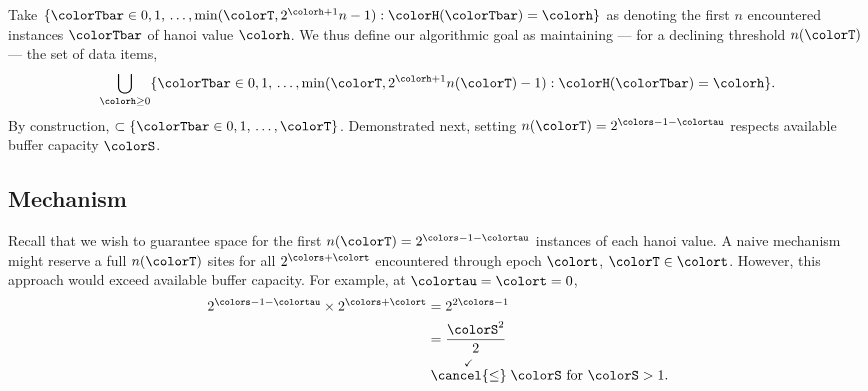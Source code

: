 Take $\{ \colorTbar \in 0, 1, \, \ldots, \min(\colorT, 2^{\colorh + 1}n - 1) : \colorH(\colorTbar) = \colorh \}$ as denoting the first $n$ encountered instances $\colorTbar$ of hanoi value $\colorh$.
We thus define our algorithmic goal as maintaining --- for a declining threshold $n(\colorT)$ --- the set of data items,
\begin{align*}
\bigcup_{\colorh \geq 0}
\{ \colorTbar \in 0, 1, \, \ldots, \min(\colorT, 2^{\colorh + 1}n(\colorT) - 1) : \colorH(\colorTbar) = \colorh \}.
\end{align*}
By construction, $\subset \{ \colorTbar \in 0, 1, \, \ldots, \colorT \}$.
Demonstrated next, setting $n(\colorT) = 2^{\colors - 1 - \colortau}$ respects available buffer capacity $\colorS$.





\subsection{Mechanism}



Recall that we wish to guarantee space for the first $n(\colorT) =  2^{\colors - 1 - \colortau}$ instances of each hanoi value.
A naive mechanism might reserve a full $n(\colorT)$ sites for all $2^{\colors + \colort}$ encountered through epoch $\colort$, $\colorT \in \colort$.
However, this approach would exceed available buffer capacity.
For example, at $\colortau=\colort=0$,
\begin{align*}
2^{\colors - 1 - \colortau} \times 2^{\colors + \colort}
&=
2^{2\colors - 1}\\
&=
\frac{\colorS^{2}}{2}\\
&\stackrel{\checkmark}{\cancel{\leq}} \colorS \text{ for } \colorS > 1.
\end{align*}

